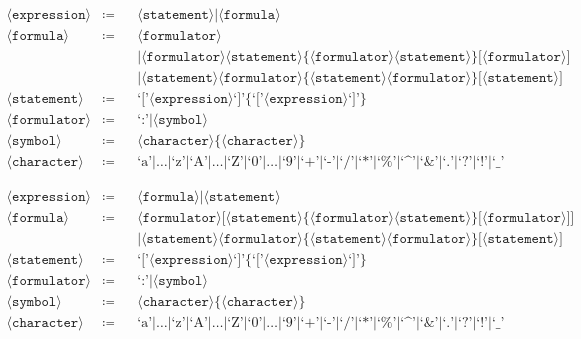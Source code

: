 \documentclass[british]{article}
\newcommand{\expression}{\langle\texttt{expression}\rangle}
\newcommand{\statement}{\langle\texttt{statement}\rangle}
\newcommand{\formula}{\langle\texttt{formula}\rangle}
\newcommand{\formulator}{\langle\texttt{formulator}\rangle}
\newcommand{\character}{\langle\texttt{character}\rangle}
\newcommand{\symb}{\langle\texttt{symbol}\rangle}
\begin{document}
\begin{align*}
\expression	& \coloneqq &&	\statement \Big| \formula\\
\formula	& \coloneqq &&	\formulator\\
			&           &&	\Big| \formulator \statement \Big\{ \formulator
							\statement \Big\} \Big[ \formulator \Big]\\
			&           &&	\Big| \statement \formulator \Big\{ \statement
							\formulator \Big\} \Big[ \statement \Big]\\
\statement	& \coloneqq &&  \textrm{`['} \expression \textrm{`]'} \Big\{
							\textrm{`['} \expression \textrm{`]'} \Big\}\\
\formulator & \coloneqq &&	\textrm{`:'} \Big| \symb\\
\symb		& \coloneqq &&  \character \Big\{ \character \Big\}\\
\character	& \coloneqq &&  \textrm{`a'} \Big| \dots \Big| \textrm{`z'} \Big|
							\textrm{`A'} \Big| \dots \Big| \textrm{`Z'} \Big|
							\textrm{`0'} \Big| \dots \Big| \textrm{`9'} \Big|
							\textrm{`+'} \Big| \textrm{`-'} \Big| \textrm{`/'}
							\Big| \textrm{`*'} \Big|\textrm{`\%'} \Big|
							\textrm{`\textasciicircum'} \Big| \textrm{`\&'}
							\Big| \textrm{`.'} \Big|\textrm{`?'} \Big|
							\textrm{`!'} \Big| \textrm{`\_'}
\end{align*}

\begin{align*}
\expression	& \coloneqq &&	\formula \Big| \statement\\
\formula	& \coloneqq &&	\formulator \bigg[ \statement \Big\{ \formulator
							\statement \Big\} \Big[ \formulator \Big] \bigg]\\
			&           &&	\Big| \statement \formulator \Big\{ \statement
							\formulator \Big\} \Big[ \statement \Big]\\
\statement	& \coloneqq &&  \textrm{`['} \expression \textrm{`]'} \Big\{
							\textrm{`['} \expression \textrm{`]'} \Big\}\\
\formulator & \coloneqq &&	\textrm{`:'} \Big| \symb\\
\symb		& \coloneqq &&  \character \Big\{ \character \Big\}\\
\character	& \coloneqq &&  \textrm{`a'} \Big| \dots \Big| \textrm{`z'} \Big|
							\textrm{`A'} \Big| \dots \Big| \textrm{`Z'} \Big|
							\textrm{`0'} \Big| \dots \Big| \textrm{`9'} \Big|
							\textrm{`+'} \Big| \textrm{`-'} \Big| \textrm{`/'}
							\Big| \textrm{`*'} \Big|\textrm{`\%'} \Big|
							\textrm{`\textasciicircum'} \Big| \textrm{`\&'}
							\Big| \textrm{`.'} \Big|\textrm{`?'} \Big|
							\textrm{`!'} \Big| \textrm{`\_'}
\end{align*}
\end{document}
